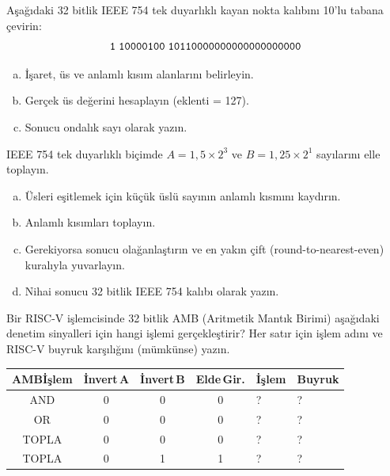 \begin{alistirma}[\orta]
Aşağıdaki 32 bitlik IEEE 754 tek duyarlıklı kayan nokta kalıbını 10'lu tabana çevirin:
\[
\texttt{1\;10000100\;10110000000000000000000}
\]
\begin{enumerate}[(a)]
\item İşaret, üs ve anlamlı kısım alanlarını belirleyin.
\item Gerçek üs değerini hesaplayın (eklenti = 127).
\item Sonucu ondalık sayı olarak yazın.
\end{enumerate}
\end{alistirma}

\begin{alistirma}[\zor]
IEEE 754 tek duyarlıklı biçimde $A = 1{,}5 \times 2^{3}$ ve $B = 1{,}25 \times 2^{1}$ sayılarını elle toplayın.
\begin{enumerate}[(a)]
\item Üsleri eşitlemek için küçük üslü sayının anlamlı kısmını kaydırın.
\item Anlamlı kısımları toplayın.
\item Gerekiyorsa sonucu olağanlaştırın ve en yakın çift (round-to-nearest-even) kuralıyla yuvarlayın.
\item Nihai sonucu 32 bitlik IEEE 754 kalıbı olarak yazın.
\end{enumerate}
\end{alistirma}

\begin{alistirma}[\kolay]
Bir RISC-V işlemcisinde 32 bitlik AMB (Aritmetik Mantık Birimi) aşağıdaki denetim sinyalleri için hangi işlemi gerçekleştirir? Her satır için işlem adını ve RISC-V buyruk karşılığını (mümkünse) yazın.

\begin{table}[htbp]
\centering
\small
\begin{tabular}{c c c c l l}
\toprule
\textbf{AMBİşlem} & \textbf{İnvert\,A} & \textbf{İnvert\,B} & \textbf{Elde\,Gir.} & \textbf{İşlem} & \textbf{Buyruk} \\
\midrule
AND  & 0 & 0 & 0 & ? & ? \\
OR   & 0 & 0 & 0 & ? & ? \\
TOPLA & 0 & 0 & 0 & ? & ? \\
TOPLA & 0 & 1 & 1 & ? & ? \\
\bottomrule
\end{tabular}
\end{table}
\end{alistirma}

